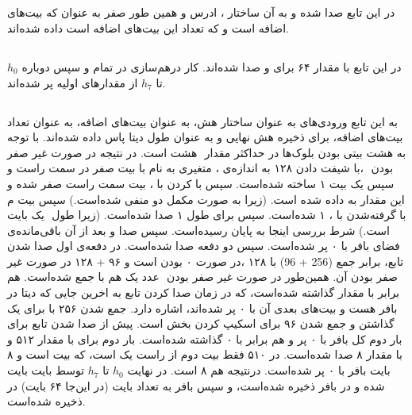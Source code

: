 \subsection{}
\label{subsec:sph-skein512-close}
\label{subsec:sph-close}
در این تابع   \hyperref[subsec:addbits]{}  صدا شده و به ‌آن  ساختار   ،  ادرس   و همین طور صفر به عنوان  که بیت‌های اضافه است و  که تعداد این بیت‌های اضافه است داده شده‌اند.


\subsection{}
\label{subsec:addbits}
\label{subsec:sph-skein-addbits-and-close}
در این تابع  \hyperref[subsec:big-close]{} با مقدار ۶۴ برای  و \hyperref[subsec:sph-skein512-init]{} صدا شده‌اند. کار درهم‌سازی در  تمام و سپس دوباره $ h_0 $ تا $ h_7 $ از مقدارهای اولیه پر شده‌اند.


\subsection{}
\label{subsec:big-close}
به این تابع ورودی‌های   به عنوان ساختار هش،   به عنوان بیت‌های اضافه،  به عنوان تعداد بیت‌های اضافه،   برای ذخیره هش نهایی و   به عنوان طول دیتا پاس داده شده‌اند. با توجه به هشت بیتی بودن بلوک‌ها در حداکثر مقدار ‌  هشت است. در نتیجه در صورت غیر صفر بودن ‌ ،با شیفت دادن ۱۲۸ به اندازه‌ی  ،  متغیری به نام    با   بیت صفر در سمت راست و سپس یک بیت ۱ ساخته‌ شده‌است. سپس  با   کردن   با    ،   بیت سمت راست   صفر شده و این مقدار به  داده شده ‌است. (زیرا   به صورت مکمل دو منفی شده‌است.) سپس بیت  م   با  گرفته‌شدن با  ، ۱ شده‌است. سپس  \hyperref[subsec:skein-big-core]{} برای طول ۱ صدا شده‌است. (زیرا طول ‌ یک بایت است.)  شرط بررسی    اینجا به پایان رسیده‌است.
سپس \hyperref[subsec:read-state-big]{} صدا و بعد از ‌آن باقی‌مانده‌ی فضای بافر با ۰ پر شده‌است.
سپس دو دفعه  \hyperref[subsec:ubi-big]{} صدا شده‌است. در دفعه‌ی اول صدا شدن تابع،   برابر جمع (256 + 96) با ۱۲۸ ،در صورت ۰ بودن   است و ۹۶ + ۱۲۸ در صورت غیر صفر بودن آن.  همین‌طور در صورت غیر صفر بودن ‌  عدد یک هم با   جمع شده‌است.   هم برابر با مقدار  گذاشته شده‌است،‌ که در زمان صدا کردن تابع به اخرین جایی که دیتا در بافر هست و بیت‌های بعدی ‌آن با ۰ پر شده‌اند، اشاره دارد. جمع شدن ۲۵۶ با   برای یک گذاشتن   و جمع شدن ۹۶ برای اسکیپ کردن بخش   است. پیش از صدا شدن تابع برای بار دوم کل بافر با ۰ پر و   هم برابر با ۰ گذاشته شده‌است. بار دوم   برای   با مقدار ۵۱۲ و  با مقدار ۸ صدا شده‌است. در ۵۱۰ فقط بیت دوم از راست یک است، که بیت  است و ۸ بایت بافر با ۰ پر شده‌است. درنتیجه  هم ۸ است.
در نهایت $ h_0 $ تا $ h_7 $ توسط  بایت بایت شده و در بافر ذخیره شده‌است، و سپس بافر به تعداد بایت  (در این‌جا ۶۴ بایت) در  ذخیره شده‌است.